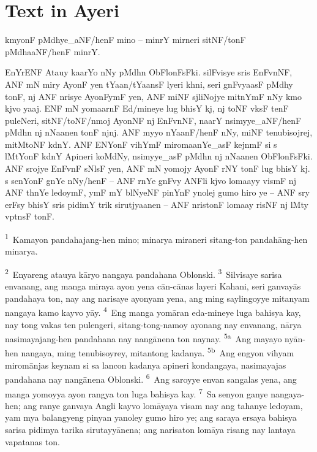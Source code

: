 \documentclass[12pt,paper=letter]{scrartcl}
\newcommand{\tsup}[1]{\textsuperscript{#1}} %
\newenvironment{ayeri}{
    \doublespacing
    \begin{multicols}{2}
    \Tagati
}{
    \end{multicols} \par
}
\begin{document}
\section{Text in Ayeri}
\begin{ayeri}
\noindent
kmyonF pMdhye\_aNF/henF mino – minrY mirneri sitNF/tonF pMdhaaNF/henF minrY.

EnYrENF Atauy kaarYo nNy pMdhn ObFlonFsFki.
silF\-visye sris EnFvnNF, ANF mN miry AyonF yen tYaan/tYaansF lyeri khni, seri 
    gnFvyaasF pMdhy tonF, nj ANF nrisye AyonF\-ymF yen, ANF miNF sjliNojye 
    mitnYmF nNy kmo kjvo yaaj. ENF mN yomaarnF Ed/mineye lug bhisY kj, nj toNF 
    vksF tenF puleNeri, sitNF/toNF/nmoj AyonNF nj EnFvnNF, naarY 
    nsimyye\_aNF/henF pMdhn nj nNaanen tonF njnj. 
ANF myyo nYaanF/henF nNy, miNF tenubisojrej, mitMtoNF kdnY.
ANF ENYonF vihYmF miromaanYe\_asF kejnmF si s lMtYonF kdnY Apineri koMdNy, 
    nsimyye\_asF pMdhn nj nNaanen ObFlonFsFki.
ANF srojye EnFvnF sNlsF yen, ANF mN yomojy AyonF rNY tonF lug bhisY kj.
s senYonF gnYe nNy/henF – ANF rnYe gnF\-vy ANFli kjvo lomaayy vismF nj ANF 
    thnYe ledoymF, ymF mY blNyeNF pinYnF ynolej gumo hiro ye – ANF sry erFsy
    bhisY sris pidimY trik sirutjyaanen – ANF nristonF lomaay risNF nj lMty
    vptnsF tonF.
\end{ayeri}

\noindent
\tsup{1}~Kamayon pandahajang-hen mino; minarya miraneri sitang-ton 
    pandahāng-hen minarya.

\tsup{2}~Enyareng atauya kāryo nangaya pandahana Oblonski.
\tsup{3}~Silvisaye sarisa envanang, ang manga miraya ayon yena cān-cānas layeri 
    Kahani, seri ganvayās pandahaya ton, nay ang narisaye ayonyam yena, ang 
    ming saylingoyye mitanyam nangaya kamo kayvo yāy.
\tsup{4}~Eng manga yomāran eda-mineye luga bahisya kay, nay tong vakas ten 
    pulengeri, sitang-tong-namoy ayonang nay envanang, nārya nasimayajang-hen 
    pandahana nay nangānena ton naynay.
\tsup{5a}~Ang mayayo nyān-hen nangaya, ming tenubisoyrey, mitantong kadanya.
\tsup{5b}~Ang engyon vihyam miromānjas keynam si sa lancon kadanya apineri 
    kondangaya, nasimayajas pandahana nay nangānena Oblonski.
\tsup{6}~Ang saroyye envan sangalas yena, ang manga yomoyya ayon rangya ton 
    luga bahisya kay.
\tsup{7}~Sa senyon ganye nangaya-hen; ang ranye ganvaya Angli kayvo lomāyaya 
    visam nay ang tahanye ledoyam, yam mya balangyeng pinyan yanoley gumo hiro 
    ye; ang saraya ersaya bahisya sarisa pidimya tarika sirutayyānena; ang 
    narisaton lomāya risang nay lantaya vapatanas ton.
\end{document}
